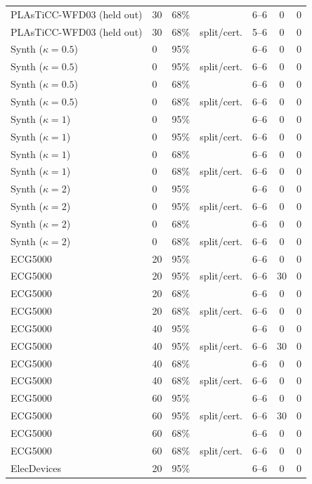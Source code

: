 \begin{longtable}{llllccc}
PLAsTiCC-WFD03 (held out) & 30 & 68\% & \gamut{} & 6--6 & 0 & 0 \\
PLAsTiCC-WFD03 (held out) & 30 & 68\% & split/cert. & 5--6 & 0 & 0 \\
Synth ($\kappa{=}0.5$) & 0 & 95\% & \gamut{} & 6--6 & 0 & 0 \\
Synth ($\kappa{=}0.5$) & 0 & 95\% & split/cert. & 6--6 & 0 & 0 \\
Synth ($\kappa{=}0.5$) & 0 & 68\% & \gamut{} & 6--6 & 0 & 0 \\
Synth ($\kappa{=}0.5$) & 0 & 68\% & split/cert. & 6--6 & 0 & 0 \\
Synth ($\kappa{=}1$) & 0 & 95\% & \gamut{} & 6--6 & 0 & 0 \\
Synth ($\kappa{=}1$) & 0 & 95\% & split/cert. & 6--6 & 0 & 0 \\
Synth ($\kappa{=}1$) & 0 & 68\% & \gamut{} & 6--6 & 0 & 0 \\
Synth ($\kappa{=}1$) & 0 & 68\% & split/cert. & 6--6 & 0 & 0 \\
Synth ($\kappa{=}2$) & 0 & 95\% & \gamut{} & 6--6 & 0 & 0 \\
Synth ($\kappa{=}2$) & 0 & 95\% & split/cert. & 6--6 & 0 & 0 \\
Synth ($\kappa{=}2$) & 0 & 68\% & \gamut{} & 6--6 & 0 & 0 \\
Synth ($\kappa{=}2$) & 0 & 68\% & split/cert. & 6--6 & 0 & 0 \\
ECG5000 & 20 & 95\% & \gamut{} & 6--6 & 0 & 0 \\
ECG5000 & 20 & 95\% & split/cert. & 6--6 & 30 & 0 \\
ECG5000 & 20 & 68\% & \gamut{} & 6--6 & 0 & 0 \\
ECG5000 & 20 & 68\% & split/cert. & 6--6 & 0 & 0 \\
ECG5000 & 40 & 95\% & \gamut{} & 6--6 & 0 & 0 \\
ECG5000 & 40 & 95\% & split/cert. & 6--6 & 30 & 0 \\
ECG5000 & 40 & 68\% & \gamut{} & 6--6 & 0 & 0 \\
ECG5000 & 40 & 68\% & split/cert. & 6--6 & 0 & 0 \\
ECG5000 & 60 & 95\% & \gamut{} & 6--6 & 0 & 0 \\
ECG5000 & 60 & 95\% & split/cert. & 6--6 & 30 & 0 \\
ECG5000 & 60 & 68\% & \gamut{} & 6--6 & 0 & 0 \\
ECG5000 & 60 & 68\% & split/cert. & 6--6 & 0 & 0 \\
ElecDevices & 20 & 95\% & \gamut{} & 6--6 & 0 & 0 \\

\end{longtable}
